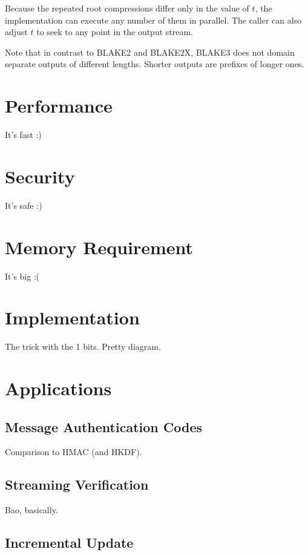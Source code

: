 \documentclass[11pt,notitlepage,a4paper]{article}
\begin{document}
Because the repeated root compressions differ only in the value of $t$, the
implementation can execute any number of them in parallel. The caller can also
adjust $t$ to seek to any point in the output stream.

Note that in contrast to BLAKE2 and BLAKE2X, BLAKE3 does not domain separate
outputs of different lengths. Shorter outputs are prefixes of longer ones.

\section{Performance}\label{sec:performance}

It's fast :)

\section{Security}\label{sec:security}

It's safe :)

\section{Memory Requirement}\label{sec:memory}

It's big :(

\section{Implementation}\label{sec:memory}

The trick with the 1 bits. Pretty diagram.

\section{Applications}\label{sec:memory}

  \subsection{Message Authentication Codes}\label{sec:mac}

  Comparison to HMAC (and HKDF).

  \subsection{Streaming Verification}\label{sec:streamingverification}

  Bao, basically.

  \subsection{Incremental Update}\label{sec:incrementalupdate}
\end{document}
